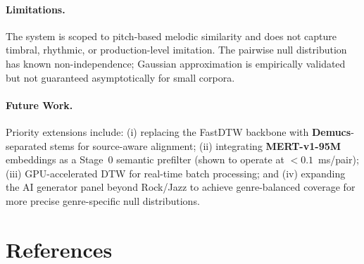 \documentclass[12pt,a4paper]{article}
\begin{document}
\paragraph{Limitations.}
The system is scoped to pitch-based melodic similarity and does not capture
timbral, rhythmic, or production-level imitation. The pairwise null distribution
has known non-independence; Gaussian approximation is empirically validated
but not guaranteed asymptotically for small corpora.

\paragraph{Future Work.}
Priority extensions include: (i) replacing the FastDTW backbone with
\textbf{Demucs}-separated stems \cite{defossez2021hybrid} for source-aware
alignment; (ii) integrating \textbf{MERT-v1-95M} \cite{li2023mert} embeddings
as a Stage~0 semantic prefilter (shown to operate at $<0.1$~ms/pair);
(iii) GPU-accelerated DTW for real-time batch processing; and (iv) expanding
the AI generator panel beyond Rock/Jazz to achieve genre-balanced coverage
for more precise genre-specific null distributions.

\section{References}
\label{sec:references}
\end{document}

